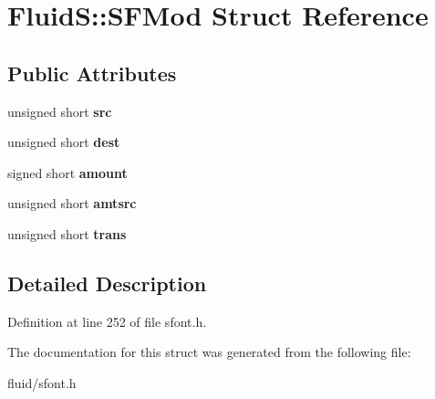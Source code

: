 \hypertarget{struct_fluid_s_1_1_s_f_mod}{}\section{FluidS\+:\+:S\+F\+Mod Struct Reference}
\label{struct_fluid_s_1_1_s_f_mod}
\subsection*{Public Attributes}
\begin{DoxyCompactItemize}
\item 
\mbox{\label{struct_fluid_s_1_1_s_f_mod_a87044a8c0542c693a7029e6e64db86d2}} 
unsigned short {\bfseries src}
\item 
\mbox{\label{struct_fluid_s_1_1_s_f_mod_a6470d34852a1f84ace871a4fb565229a}} 
unsigned short {\bfseries dest}
\item 
\mbox{\label{struct_fluid_s_1_1_s_f_mod_a404b52cca2285f6c571fbab2010db90c}} 
signed short {\bfseries amount}
\item 
\mbox{\label{struct_fluid_s_1_1_s_f_mod_a341cee795ec9ebf8387cc3ba68ba1c3e}} 
unsigned short {\bfseries amtsrc}
\item 
\mbox{\label{struct_fluid_s_1_1_s_f_mod_aea75f919a0f3ddde2aad0a4a87d6fe8e}} 
unsigned short {\bfseries trans}
\end{DoxyCompactItemize}


\subsection{Detailed Description}


Definition at line 252 of file sfont.\+h.



The documentation for this struct was generated from the following file\+:\begin{DoxyCompactItemize}
\item 
fluid/sfont.\+h\end{DoxyCompactItemize}
